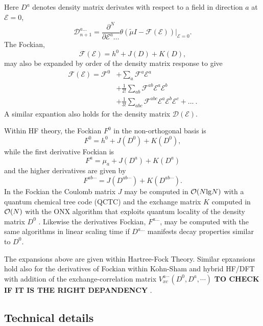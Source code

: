 \documentclass[prl,aps,twocolumn,showpacs,twocolumngrid,superbib]{revtex4}
\def\F{\mathcal{F}}
\def\D{\mathcal{D}}
\def\E{\mathcal{E}}
\begin{document}
Here $D^{a}$ denotes density matrix derivates with respect to a field in  direction $a$ 
at $\mathcal{E} = 0$,
\begin{equation}
 \displaystyle\D^{a\ldots}_{n+1}=
 \frac{\partial^N}{\partial\E^a\ldots}\theta(\tilde{\mu}I-
 \F(\E))\bigg|_{\E=0} \label{DDeriv}.
\end{equation}
 The Fockian, 
\begin{equation}
\F(\E) = h^0+J(D)+K(D),
\end{equation}
may also be expanded by order of the density matrix response to give
\begin{equation}
  \begin{split}
    \F(\E)=\F^{0} & +\sum_a \F^{a}\E^{a}\\
    &+\frac{1}{2!}\sum_{ab} \F^{ab}\E^{a}\E^{b}\\
    &+\frac{1}{3!}\sum_{abc} \F^{abc}\E^{a}\E^{b}\E^{c}+\dots ~.
  \end{split}
\end{equation}
A similar expantion also holds for the density matrix $\D(\E)$.

Within HF theory, the Fockian $F^0$ in the non-orthogonal 
basis is 
\begin{equation}
F^0=h^0+J(D^0)+K(D^0), 
\end{equation}
while the first derivative Fockian is 
\begin{equation}
F^a=\mu_a+J(D^a)+K(D^a)
\end{equation}
and the higher derivatives are given by 
\begin{equation}
F^{ab\cdots}=J(D^{ab\cdots})+K(D^{ab\cdots}). 
\end{equation}
In the Fockian the Coulomb matrix $J$ may be computed in ${\cal O}(N{\rm lg}N)$ 
with a quantum chemical tree code (QCTC) \cite{MChallacombe97} and the
exchange matrix $K$ computed in ${\cal O}(N)$ with the ONX algorithm 
that exploits quantum locality of the density matrix $D^0$ \cite{ESchwegler97}.
Likewise the derivatives Fockian, $F^{a\ldots}$, may be computed 
with the same algorithms in linear scaling time if 
$D^{a\ldots}$ manifests decay properties similar to $D^0$. 

The expansions above are given within Hartree-Fock Theory. 
Similar epxansions hold also for the derivatives of Fockian
within Kohn-Sham and hybrid HF/DFT with addition of 
the exchange-correlation matrix $V_{xc}^{a\cdots}(D^0,D^a,\cdots)$ 
{\bf TO CHECK IF IT IS THE RIGHT DEPANDENCY} \cite{Lee_1994}.

\subsection{Technical details}
\end{document}
